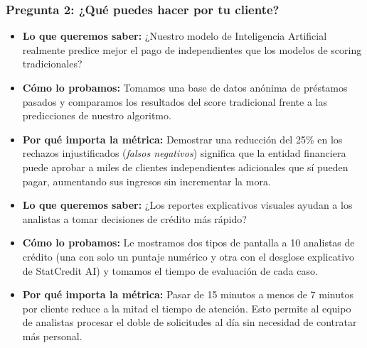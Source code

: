 \documentclass[11pt,a4paper]{article}
\begin{document}
\subsubsection{Pregunta 2: ¿Qué puedes hacer por tu cliente?}

\begin{tcolorbox}[colback=lightgray,colframe=secondary,title=\textbf{Experimento 2.1: Probar el modelo con datos pasados (Backtesting)}]
\begin{itemize}[leftmargin=*]
    \item \textbf{Lo que queremos saber:} ¿Nuestro modelo de Inteligencia Artificial realmente predice mejor el pago de independientes que los modelos de scoring tradicionales?
    \item \textbf{Cómo lo probamos:} Tomamos una base de datos anónima de préstamos pasados y comparamos los resultados del score tradicional frente a las predicciones de nuestro algoritmo.
    \item \textbf{Por qué importa la métrica:} Demostrar una reducción del 25\% en los rechazos injustificados (\textit{falsos negativos}) significa que la entidad financiera puede aprobar a miles de clientes independientes adicionales que sí pueden pagar, aumentando sus ingresos sin incrementar la mora.
\end{itemize}
\end{tcolorbox}

\begin{tcolorbox}[colback=lightgray,colframe=secondary,title=\textbf{Experimento 2.2: Prueba de usabilidad de reportes con analistas de riesgo}]
\begin{itemize}[leftmargin=*]
    \item \textbf{Lo que queremos saber:} ¿Los reportes explicativos visuales ayudan a los analistas a tomar decisiones de crédito más rápido?
    \item \textbf{Cómo lo probamos:} Le mostramos dos tipos de pantalla a 10 analistas de crédito (una con solo un puntaje numérico y otra con el desglose explicativo de StatCredit AI) y tomamos el tiempo de evaluación de cada caso.
    \item \textbf{Por qué importa la métrica:} Pasar de 15 minutos a menos de 7 minutos por cliente reduce a la mitad el tiempo de atención. Esto permite al equipo de analistas procesar el doble de solicitudes al día sin necesidad de contratar más personal.
\end{itemize}
\end{tcolorbox}
\end{document}
